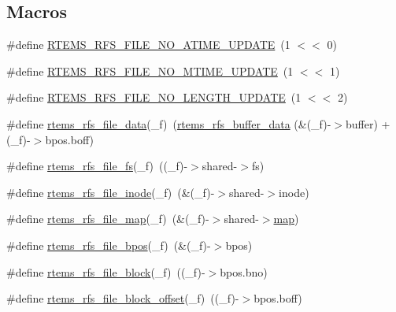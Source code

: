 \subsection*{Macros}
\begin{DoxyCompactItemize}
\item 
\#define \mbox{\hyperlink{rtems-rfs-file_8h_aa2ec4bfbf423d3b274ca575bdb3301ad}{R\+T\+E\+M\+S\+\_\+\+R\+F\+S\+\_\+\+F\+I\+L\+E\+\_\+\+N\+O\+\_\+\+A\+T\+I\+M\+E\+\_\+\+U\+P\+D\+A\+TE}}~(1 $<$$<$ 0)
\item 
\#define \mbox{\hyperlink{rtems-rfs-file_8h_a3f537f7b4684a012ca3e27bf608b9ac3}{R\+T\+E\+M\+S\+\_\+\+R\+F\+S\+\_\+\+F\+I\+L\+E\+\_\+\+N\+O\+\_\+\+M\+T\+I\+M\+E\+\_\+\+U\+P\+D\+A\+TE}}~(1 $<$$<$ 1)
\item 
\#define \mbox{\hyperlink{rtems-rfs-file_8h_a9e9bbd4e5f667652ead3ad1268bfe049}{R\+T\+E\+M\+S\+\_\+\+R\+F\+S\+\_\+\+F\+I\+L\+E\+\_\+\+N\+O\+\_\+\+L\+E\+N\+G\+T\+H\+\_\+\+U\+P\+D\+A\+TE}}~(1 $<$$<$ 2)
\item 
\#define \mbox{\hyperlink{rtems-rfs-file_8h_afe557c4a6812ce29a1c43640b51f561e}{rtems\+\_\+rfs\+\_\+file\+\_\+data}}(\+\_\+f)~(\mbox{\hyperlink{rtems-rfs-buffer_8h_aeb8816b42da7435346c907b381188402}{rtems\+\_\+rfs\+\_\+buffer\+\_\+data}} (\&(\+\_\+f)-\/$>$buffer) + (\+\_\+f)-\/$>$bpos.\+boff)
\item 
\#define \mbox{\hyperlink{rtems-rfs-file_8h_a4c7546d9fdb507dcd132e994a235242a}{rtems\+\_\+rfs\+\_\+file\+\_\+fs}}(\+\_\+f)~((\+\_\+f)-\/$>$shared-\/$>$fs)
\item 
\#define \mbox{\hyperlink{rtems-rfs-file_8h_a4e59d7442e15f61e6eaa5d3a50a672f7}{rtems\+\_\+rfs\+\_\+file\+\_\+inode}}(\+\_\+f)~(\&(\+\_\+f)-\/$>$shared-\/$>$inode)
\item 
\#define \mbox{\hyperlink{rtems-rfs-file_8h_ad929421716f250f6c7e5ed20a9da11d5}{rtems\+\_\+rfs\+\_\+file\+\_\+map}}(\+\_\+f)~(\&(\+\_\+f)-\/$>$shared-\/$>$\mbox{\hyperlink{struct__map}{map}})
\item 
\#define \mbox{\hyperlink{rtems-rfs-file_8h_a21b9de6a6c7437246e73260be684ee87}{rtems\+\_\+rfs\+\_\+file\+\_\+bpos}}(\+\_\+f)~(\&(\+\_\+f)-\/$>$bpos)
\item 
\#define \mbox{\hyperlink{rtems-rfs-file_8h_af033b8990fc9d2d3410099e4a4209100}{rtems\+\_\+rfs\+\_\+file\+\_\+block}}(\+\_\+f)~((\+\_\+f)-\/$>$bpos.\+bno)
\item 
\#define \mbox{\hyperlink{rtems-rfs-file_8h_a205fd0f3d98c21f4b194ae800d1d567f}{rtems\+\_\+rfs\+\_\+file\+\_\+block\+\_\+offset}}(\+\_\+f)~((\+\_\+f)-\/$>$bpos.\+boff)
\item 
$$
\end{DoxyCompactItemize}
